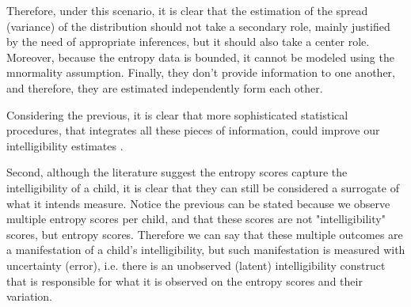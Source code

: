 Therefore, under this scenario, it is clear that the estimation of the spread (variance) of the distribution should not take a secondary role, mainly justified by the need of appropriate inferences, but it should also take a center role. Moreover, because the entropy data is bounded, it cannot be modeled using the mnormality assumption. Finally, they don't provide information to one another, and therefore, they are estimated independently form each other.

Considering the previous, it is clear that more sophisticated statistical procedures, that integrates all these pieces of information, could improve our intelligibility estimates \citep{McElreath_2020}.

\begin{comment}
	
	First, as previous paragraphs reveal, the intelligibility scores are `complex' in nature, however, such `complexity' is rarely fully considered in the statistical modeling procedure. The problem with the later is that, because the data does not fulfill the typical assumptions, e.g. normality, its analysis under such models might lead us to erroneous conclusions \textcolor{red}{[citation]}. On the one hand, outcomes such as the number of (un)intelligible words are discrete, while the entropy scores are continuous in nature. In addition, there is the consideration that both scores are constraint in specific bounds, i.e. the number of (un)intelligible words cannot be negative, while the entropy scores are in the bounds between zero and one. Finally, given the rating procedure's nature, the scores are produced in a clustered manner, i.e. we observe several score measurements per child. 
	
	So far the literature shows that, even when the data does not conform to the `normality' assumption, the applied statistical procedures are still supported on it, examples of this can be seen in \citep{Boonen_et_al_2021, Flipsen_et_al_2006} and \citep{Hustad_et_al_2020}. In addition, some papers in the literature have even used (hierarchical) multilevel modeling to deal with the clustered nature of the data, e.g. \citep{Boonen_et_al_2021}. However, to the authors knowledge, no paper have dealt with all of the data nuances at once, which leads us to believe that, by using more sophisticated statistical models we could improve our statistical inferences. 

\end{comment}

Second, although the literature suggest the entropy scores capture the intelligibility of a child, it is clear that they can still be considered a surrogate of what it intends measure. Notice the previous can be stated because we observe multiple entropy scores per child, and that these scores are not "intelligibility" scores, but entropy scores. Therefore we can say that these multiple outcomes are a manifestation of a child's intelligibility, but such manifestation is measured with uncertainty (error), i.e. there is an unobserved (latent) intelligibility construct that is responsible for what it is observed on the entropy scores and their variation. 

